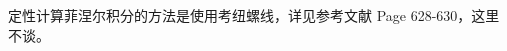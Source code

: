 \documentclass[UTF8]{report}
\theoremstyle{MyLineTheoremStyle} %
\theoremstyle{MyBlockTheoremStyle} %
\theoremstyle{MySubsubsectionStyle} %
\begin{document}
定性计算菲涅尔积分的方法是使用考纽螺线，详见参考文献 \cite{Optics} Page 628-630，这里不谈。










































































\nocite{*}

\thispagestyle{fancy} 























\newpage
\appendix
\titleformat{\chapter}[hang]{\normalfont\huge\bfseries\centering}{}{20pt}{}
\titlespacing*{\chapter}{0pt}{-25pt}{8pt} %
\titleformat{\section}[hang]{\normalfont\centering\Large\bfseries}{\thesection}{8pt}{}
\end{document}
